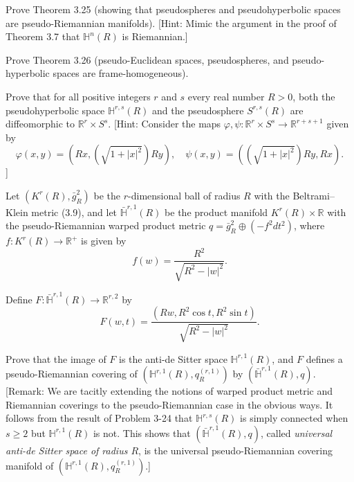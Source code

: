 \begin{exercise}\label{prob:pseudospheres-pseudo-riemannian}
Prove Theorem 3.25 (showing that pseudospheres and pseudohyperbolic spaces are pseudo-Riemannian manifolds). [Hint: Mimic the argument in the proof of Theorem 3.7 that $\mathbb{H}^n(R)$ is Riemannian.]
\end{exercise}

\begin{exercise}
\label{prob:frame-homogeneity-pseudo-spaces}
Prove Theorem 3.26 (pseudo-Euclidean spaces, pseudospheres, and pseudo-hyperbolic spaces are frame-homogeneous).
\end{exercise}

\begin{exercise}
\label{prob:diffeomorphism-pseudohyperbolic-pseudosphere}
Prove that for all positive integers $r$ and $s$ every real number $R > 0$, both the pseudohyperbolic space $\mathbb{H}^{r,s}(R)$ and the pseudosphere $S^{r,s}(R)$ are diffeomorphic to $\mathbb{R}^r \times S^s$. [Hint: Consider the maps $\varphi, \psi : \mathbb{R}^r \times S^s \to \mathbb{R}^{r+s+1}$ given by
\[
\varphi(x,y) = \left(Rx, \left(\sqrt{1 + |x|^2}\right) Ry\right), \quad \psi(x,y) = \left(\left(\sqrt{1 + |x|^2}\right) Ry, Rx\right).
\]
]
\end{exercise}

\begin{exercise}
\label{prob:universal-anti-de-sitter}
Let $(K^r(R), \bar{g}_R^2)$ be the $r$-dimensional ball of radius $R$ with the Beltrami--Klein metric (3.9), and let $\bar{\mathbb{H}}^{r,1}(R)$ be the product manifold $K^r(R) \times \mathbb{R}$ with the pseudo-Riemannian warped product metric $q = \bar{g}_R^2 \oplus (-f^2 dt^2)$, where $f: K^r(R) \to \mathbb{R}^+$ is given by
\[
f(w) = \frac{R^2}{\sqrt{R^2 - |w|^2}}.
\]

Define $F: \bar{\mathbb{H}}^{r,1}(R) \to \mathbb{R}^{r,2}$ by
\[
F(w,t) = \frac{(Rw, R^2 \cos t, R^2 \sin t)}{\sqrt{R^2 - |w|^2}}.
\]

Prove that the image of $F$ is the anti-de Sitter space $\mathbb{H}^{r,1}(R)$, and $F$ defines a pseudo-Riemannian covering of $(\mathbb{H}^{r,1}(R), q_R^{(r,1)})$ by $(\bar{\mathbb{H}}^{r,1}(R), q)$. [Remark: We are tacitly extending the notions of warped product metric and Riemannian coverings to the pseudo-Riemannian case in the obvious ways. It follows from the result of Problem 3-24 that $\mathbb{H}^{r,s}(R)$ is simply connected when $s \geq 2$ but $\mathbb{H}^{r,1}(R)$ is not. This shows that $(\bar{\mathbb{H}}^{r,1}(R), q)$, called \textit{universal anti-de Sitter space of radius $R$}, is the universal pseudo-Riemannian covering manifold of $(\mathbb{H}^{r,1}(R), q_R^{(r,1)})$.]
\end{exercise}
